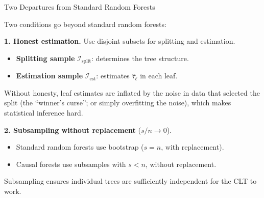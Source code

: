 \documentclass[aspectratio=169, 11pt, handout]{beamer}
\begin{document}
\begin{frame}{Two Departures from Standard Random Forests}

Two conditions go beyond standard random forests:
 
\bigskip
 
\textbf{1. Honest estimation.} Use disjoint subsets for splitting and estimation.
 
\begin{itemize}
    \item \textbf{Splitting sample} $\mathcal{I}_{\text{split}}$: determines the tree structure.
    \item \textbf{Estimation sample} $\mathcal{I}_{\text{est}}$: estimates $\hat{\tau}_\ell$ in each leaf.
\end{itemize}
 
\medskip
 
Without honesty, leaf estimates are inflated by the noise in data that selected the split (the ``winner's curse''; or simply overfitting the noise), which makes statistical inference hard.
 
\pause
\bigskip
 
\textbf{2. Subsampling without replacement} ($s/n \to 0$).
 
\begin{itemize}
    \item Standard random forests use bootstrap ($s = n$, with replacement).
    \item Causal forests use subsamples with $s < n$, without replacement.
\end{itemize}
 
\medskip
 
Subsampling ensures individual trees are sufficiently independent for the CLT to work.
 
\end{frame}
 
\end{document}
